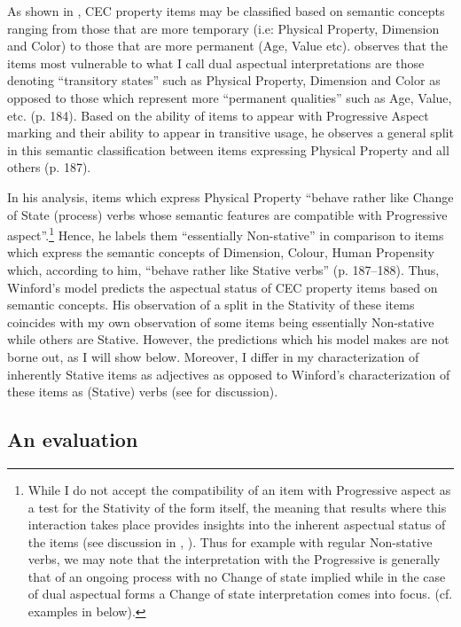 As shown in , CEC property items may be classified
based on semantic concepts ranging from those that are more temporary
(i.e: Physical Property, Dimension and Color) to those that are more
permanent (Age, Value etc).  \citet{Winford1993} observes that the
items most vulnerable to what I call dual aspectual interpretations
are those denoting ``transitory states'' such as Physical Property,
Dimension and Color as opposed to those which represent more
``permanent qualities'' such as Age, Value, etc. (p. 184).  Based on the
ability of items to appear with Progressive Aspect marking and their
ability to appear in transitive usage, he observes a general split in
this semantic classification between items expressing Physical
Property and all others (p. 187).

In his analysis, items which express Physical Property “behave rather
like Change of State (process) verbs whose semantic features are
compatible with Progressive aspect”.\footnote{While I do not accept the
  compatibility of an item with Progressive aspect as a test for the
  Stativity of the form itself, the meaning that results where this
  interaction takes place provides insights into the inherent
  aspectual status of the items (see discussion in ,
  ). Thus for example with regular Non-stative verbs,
  we may note that the interpretation with the Progressive is
  generally that of an ongoing process with no Change of state implied
  while in the case of dual aspectual forms a Change of state
  interpretation comes into focus. (cf. examples in 
  below).} Hence, he labels them “essentially Non-stative” in
comparison to items which express the semantic concepts of Dimension,
Colour, Human Propensity which, according to him, “behave rather like
Stative verbs” (p. 187--188).  Thus, Winford’s model predicts the
aspectual status of CEC property items based on semantic concepts.
His observation of a split in the Stativity of these items coincides
with my own observation of some items being essentially Non-stative
while others are Stative.  However, the predictions which his model
makes are not borne out, as I will show below.  Moreover, I differ in
my characterization of inherently Stative items as adjectives as
opposed to Winford’s characterization of these items as (Stative)
verbs (see  for discussion).

\subsection{An evaluation}\label{sec:3.3.1}

